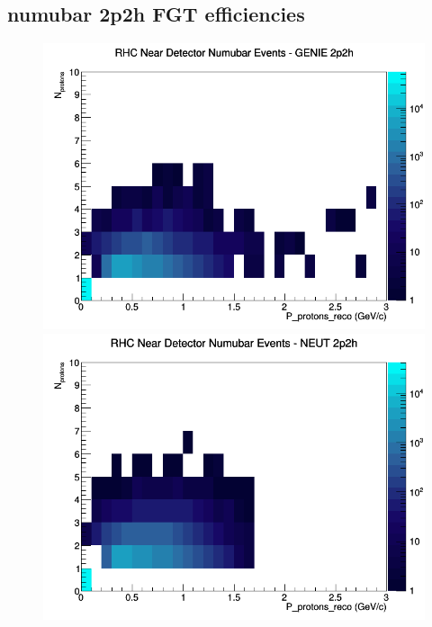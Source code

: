 \documentclass[12pt]{article}
\begin{document}
\subsection{numubar 2p2h FGT efficiencies}
\begin{figure}[h]
\includegraphics[width=\linewidth]{eff_N_P/FGT/protons/2p2h_RHC_ND_numubar_N_P_GENIE.png}
\endminipage
{}
\includegraphics[width=\linewidth]{eff_N_P/FGT/protons/2p2h_RHC_ND_numubar_N_P_NEUT.png}
\endminipage
{}

\end{figure}
\end{document}
